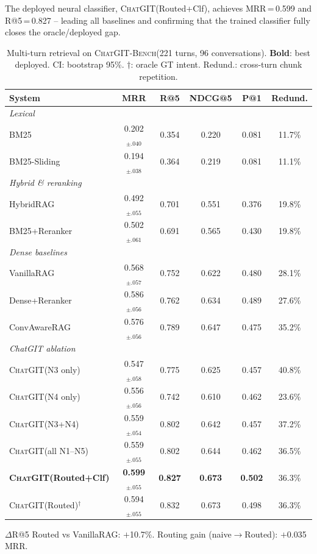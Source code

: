 \documentclass[conference]{IEEEtran}
\newcommand{\chatgit}{\textsc{ChatGIT}\xspace}
\newcommand{\conv}{\textsc{ChatGIT-Bench}\xspace}
\begin{document}
The deployed neural classifier, \chatgit (Routed+Clf), achieves
MRR\,=\,0.599 and R@5\,=\,0.827 -- leading all baselines and confirming
that the trained classifier fully closes the oracle/deployed gap.

\begin{table}[ht]
\centering
\caption{Multi-turn retrieval on \conv (221 turns, 96 conversations).
\textbf{Bold}: best deployed. CI: bootstrap 95\%.
$\dagger$: oracle GT intent. Redund.: cross-turn chunk repetition.}
\label{tab:multiturn}
\footnotesize
\begin{tabular}{lccccc}
\toprule
System & MRR & R@5 & NDCG@5 & P@1 & Redund. \\
\midrule
\multicolumn{6}{l}{\textit{Lexical}} \\
BM25 & 0.202$_{\pm.040}$ & 0.354 & 0.220 & 0.081 & 11.7\% \\
BM25-Sliding & 0.194$_{\pm.038}$ & 0.364 & 0.219 & 0.081 & 11.1\% \\
\multicolumn{6}{l}{\textit{Hybrid \& reranking}} \\
HybridRAG & 0.492$_{\pm.055}$ & 0.701 & 0.551 & 0.376 & 19.8\% \\
BM25+Reranker & 0.502$_{\pm.061}$ & 0.691 & 0.565 & 0.430 & 19.8\% \\
\multicolumn{6}{l}{\textit{Dense baselines}} \\
VanillaRAG & 0.568$_{\pm.057}$ & 0.752 & 0.622 & 0.480 & 28.1\% \\
Dense+Reranker & 0.586$_{\pm.056}$ & 0.762 & 0.634 & 0.489 & 27.6\% \\
ConvAwareRAG & 0.576$_{\pm.056}$ & 0.789 & 0.647 & 0.475 & 35.2\% \\
\midrule
\multicolumn{6}{l}{\textit{ChatGIT ablation}} \\
\chatgit (N3 only) & 0.547$_{\pm.058}$ & 0.775 & 0.625 & 0.457 & 40.8\% \\
\chatgit (N4 only) & 0.556$_{\pm.056}$ & 0.742 & 0.610 & 0.462 & 23.6\% \\
\chatgit (N3+N4) & 0.559$_{\pm.054}$ & 0.802 & 0.642 & 0.457 & 37.2\% \\
\chatgit (all N1--N5) & 0.559$_{\pm.055}$ & 0.802 & 0.644 & 0.462 & 36.5\% \\
\rowcolor{cIndigo!8}
\textbf{\chatgit (Routed+Clf)} & \textbf{0.599}$_{\pm.055}$ & \textbf{0.827}
  & \textbf{0.673} & \textbf{0.502} & 36.3\% \\
\rowcolor{cIndigo!8}
\chatgit (Routed)$^{\dagger}$ & 0.594$_{\pm.055}$ & 0.832 & 0.673 & 0.498 & 36.3\% \\
\bottomrule
\end{tabular}
\vspace{2pt}
{\footnotesize
$\Delta$R@5 Routed vs VanillaRAG: $+$10.7\%. Routing gain (naive$\to$Routed): $+$0.035 MRR.
}
\end{table}
\end{document}
